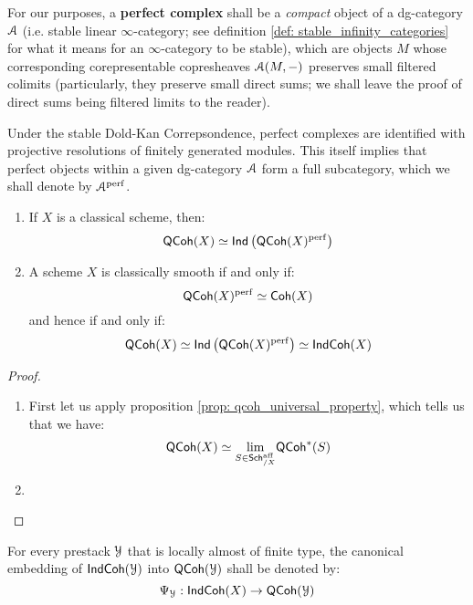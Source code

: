                 \begin{definition} \label{def: perfect_complexes}
                    For our purposes, a \textbf{perfect complex} shall be a \textit{compact} object of a dg-category $\mathcal{A}$ (i.e. stable linear $\infty$-category; see definition \ref{def: stable_infinity_categories} for what it means for an $\infty$-category to be stable), which are objects $M$ whose corresponding corepresentable copresheaves $\mathcal{A}(M, -)$ preserves small filtered colimits (particularly, they preserve small direct sums; we shall leave the proof of direct sums being filtered limits to the reader). 
                \end{definition}
                \begin{remark} \label{remark: perfect_complexes_via_dold_kan}
                    Under the stable Dold-Kan Correpsondence, perfect complexes are identified with projective resolutions of finitely generated modules. This itself implies that perfect objects within a given dg-category $\mathcal{A}$ form a full subcategory, which we shall denote by $\mathcal{A}^{\mathrm{perf}}$.
                \end{remark}
                \begin{theorem} \label{theorem: indcoh_on_classical_schemes}
                    \noindent
                    \begin{enumerate}
                        \item If $X$ is a classical scheme, then:
                            $$\mathsf{QCoh}(X) \simeq \mathsf{Ind}\left(\mathsf{QCoh}(X)^{\mathrm{perf}}\right)$$
                        \item A scheme $X$ is classically smooth if and only if:
                            $$\mathsf{QCoh}(X)^{\mathrm{perf}} \simeq \mathsf{Coh}(X)$$
                        and hence if and only if:
                            $$\mathsf{QCoh}(X) \simeq \mathsf{Ind}\left(\mathsf{QCoh}(X)^{\mathrm{perf}}\right) \simeq \mathsf{Ind}\mathsf{Coh}(X)$$
                    \end{enumerate}
                \end{theorem}
                    \begin{proof}
                        \noindent
                        \begin{enumerate}
                            \item First let us apply proposition \ref{prop: qcoh_universal_property}, which tells us that we have:
                                $$\mathsf{QCoh}(X) \simeq \underset{S \in \mathsf{Sch}^{\mathrm{aff}}_{/X}}{\operatorname{lim}} \mathsf{QCoh}^*(S)$$
                            
                            \item 
                        \end{enumerate}
                    \end{proof}
                \begin{convention} \label{conv: indcoh_to_qcoh_functor}
                    For every prestack $\mathcal{Y}$ that is locally almost of finite type, the canonical embedding of $\mathsf{Ind}\mathsf{Coh}(\mathcal{Y})$ into $\mathsf{QCoh}(\mathcal{Y})$ shall be denoted by:
                        $$\Psi_{\mathcal{Y}}: \mathsf{Ind}\mathsf{Coh}(X) \to \mathsf{QCoh}(\mathcal{Y})$$
                \end{convention}
                
